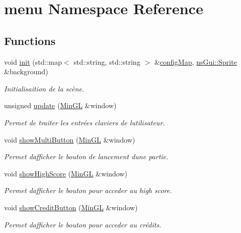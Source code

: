 \hypertarget{namespacemenu}{}\section{menu Namespace Reference}
\label{namespacemenu}
\subsection*{Functions}
\begin{DoxyCompactItemize}
\item 
void \hyperlink{namespacemenu_a6ed0d40d52a1289a0500959d2e7d8a96}{init} (std\+::map$<$ std\+::string, std\+::string $>$ \&\hyperlink{main_8cpp_ada2160bcc2082e595d02f0eb5a318dd5}{config\+Map}, \hyperlink{classns_gui_1_1_sprite}{ns\+Gui\+::\+Sprite} \&background)
\begin{DoxyCompactList}\small\item\em Initialisaition de la scène. \end{DoxyCompactList}\item 
unsigned \hyperlink{namespacemenu_afbcc14456a55b6670fff8690f2d2e3c6}{update} (\hyperlink{class_min_g_l}{Min\+GL} \&window)
\begin{DoxyCompactList}\small\item\em Permet de traiter les entrées claviers de l\textquotesingle{}utilisateur. \end{DoxyCompactList}\item 
void \hyperlink{namespacemenu_a6f05b2393e356d0d869a5628f5ce6cfc}{show\+Multi\+Button} (\hyperlink{class_min_g_l}{Min\+GL} \&window)
\begin{DoxyCompactList}\small\item\em Permet d\textquotesingle{}afficher le bouton de lancement d\textquotesingle{}une partie. \end{DoxyCompactList}\item 
void \hyperlink{namespacemenu_a119e883604e235e4ab1756bfe3e8dfca}{show\+High\+Score} (\hyperlink{class_min_g_l}{Min\+GL} \&window)
\begin{DoxyCompactList}\small\item\em Permet d\textquotesingle{}afficher le bouton pour acceder au high score. \end{DoxyCompactList}\item 
void \hyperlink{namespacemenu_aae0e9f6825309dcf954f9d175d46d750}{show\+Credit\+Button} (\hyperlink{class_min_g_l}{Min\+GL} \&window)
\begin{DoxyCompactList}\small\item\em Permet d\textquotesingle{}afficher le bouton pour acceder au crédits. \end{DoxyCompactList}\item 

\end{DoxyCompactItemize}
